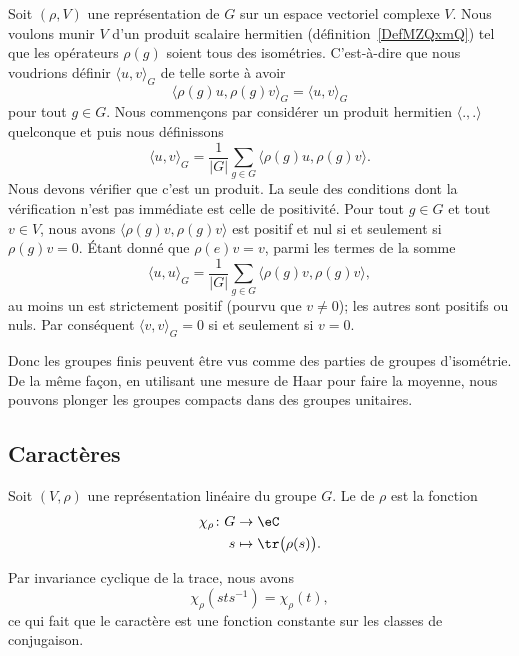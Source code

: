 Soit \( (\rho,V)\) une représentation de \( G\) sur un espace vectoriel complexe \( V\). Nous voulons munir \( V\) d'un produit scalaire hermitien (définition~\ref{DefMZQxmQ}) tel que les opérateurs \( \rho(g)\) soient tous des isométries. C'est-à-dire que nous voudrions définir \( \langle u, v\rangle_G\) de telle sorte à avoir
\begin{equation}
	\langle \rho(g)u, \rho(g)v\rangle_G =\langle u, v\rangle_G
\end{equation}
pour tout \( g\in G\). Nous commençons par considérer un produit hermitien \( \langle ., .\rangle \) quelconque et puis nous définissons
\begin{equation}
	\langle u, v\rangle_G=\frac{1}{ | G | }\sum_{g\in G}\langle \rho(g)u, \rho(g)v\rangle.
\end{equation}
Nous devons vérifier que c'est un produit. La seule des conditions dont la vérification n'est pas immédiate est celle de positivité. Pour tout \( g\in G\) et tout \( v\in V\), nous avons \( \langle \rho(g)v, \rho(g)v\rangle \) est positif et nul si et seulement si \( \rho(g)v=0\). Étant donné que \( \rho(e)v=v\), parmi les termes de la somme
\begin{equation}
	\langle u, u\rangle_G=\frac{1}{ | G | }\sum_{g\in G}\langle \rho(g)v, \rho(g)v\rangle,
\end{equation}
au moins un est strictement positif (pourvu que \( v\neq 0\)); les autres sont positifs ou nuls. Par conséquent \( \langle v, v\rangle_G=0\) si et seulement si \( v=0\).

Donc les groupes finis peuvent être vus comme des parties de groupes d'isométrie. De la même façon, en utilisant une mesure de Haar pour faire la moyenne, nous pouvons plonger les groupes compacts dans des groupes unitaires.

\subsection{Caractères}

\begin{definition}
	Soit \( (V,\rho)\) une représentation linéaire du groupe \( G\). Le  de \( \rho\) est la fonction
	\begin{equation}
		\begin{aligned}
			\chi_{\rho}\colon G & \to \eC                         \\
			s                   & \mapsto \tr\big( \rho(s) \big).
		\end{aligned}
	\end{equation}
\end{definition}
Par invariance cyclique de la trace, nous avons
\begin{equation}
	\chi_{\rho}(sts^{-1})=\chi_{\rho}(t),
\end{equation}
ce qui fait que le caractère est une fonction constante sur les classes de conjugaison.


